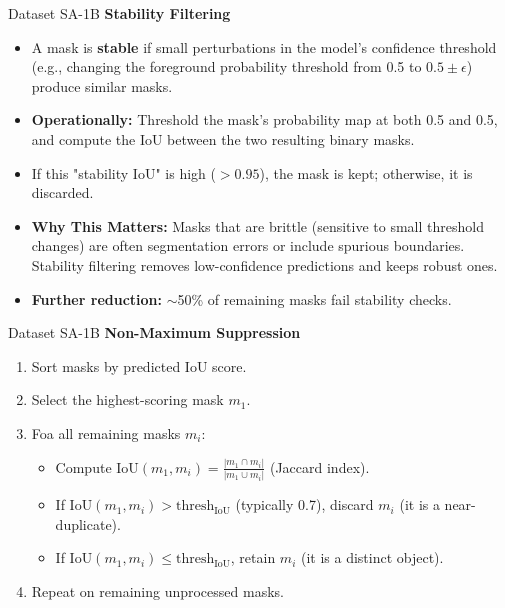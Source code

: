 \documentclass[11pt, aspectratio=169]{beamer}
\begin{document}
\begin{frame}{Dataset SA-1B}
	\textbf{Stability Filtering}\\
	\begin{itemize}
		\item A mask is \textbf{stable} if small perturbations in the model's confidence threshold (e.g., changing the foreground probability threshold from 0.5 to $0.5 \pm \epsilon$) produce similar masks.
		\item \textbf{Operationally:} Threshold the mask's probability map at both 0.5 and 0.5, and compute the IoU between the two resulting binary masks.
		\item If this "stability IoU" is high ($> 0.95$), the mask is kept; otherwise, it is discarded.
		\item \textbf{Why This Matters:} Masks that are brittle (sensitive to small threshold changes) are often segmentation errors or include spurious boundaries. Stability filtering removes low-confidence predictions and keeps robust ones.
		\item \textbf{Further reduction:} $\sim$50\% of remaining masks fail stability checks.
	\end{itemize}
\end{frame}

\begin{frame}{Dataset SA-1B}
	\textbf{Non-Maximum Suppression}\\
	\begin{enumerate}
		\item Sort masks by predicted IoU score.
		\item Select the highest-scoring mask $m_1$.
		\item Foa all remaining masks $m_i$:
		\begin{itemize}
			\item Compute $\text{IoU}(m_1, m_i) = \frac{|m_1 \cap m_i|}{|m_1 \cup m_i|}$ (Jaccard index).
			\item If $\text{IoU}(m_1, m_i) > \text{thresh}_{\text{IoU}}$ (typically 0.7), discard $m_i$ (it is a near-duplicate).
			\item If $\text{IoU}(m_1, m_i) \leq \text{thresh}_{\text{IoU}}$, retain $m_i$ (it is a distinct object).
		\end{itemize}
		\item Repeat on remaining unprocessed masks.
	\end{enumerate}
\end{frame}
\end{document}
